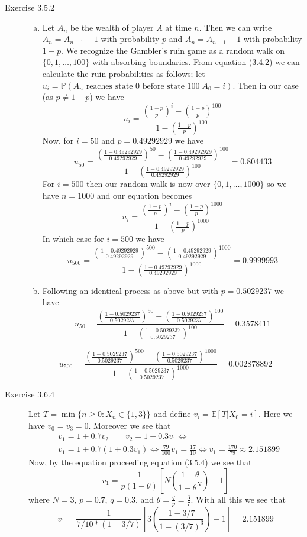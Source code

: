\documentclass[12pt]{article}  %
\newcommand{\E}{{\mathbb{E}}}
\newcommand{\prob}{{\mathbb{P}}}
\begin{document}
\begin{description}
\item[Exercise 3.5.2]
\begin{enumerate}[(a)]
\item Let $A_n$ be the wealth of player $A$ at time $n$. Then we can write $A_n = A_{n-1} + 1$ with probability $p$ and $A_n = A_{n-1}-1$ with probability $1-p$. We recognize the Gambler's ruin game as a random walk on $\{0, 1, \ldots, 100\}$ with absorbing boundaries. From equation (3.4.2) we can calculate the ruin probabilities as follows; let $u_i = \prob(\text{$A_n$ reaches state 0 before state $100$}|A_0 = i)$. Then in our case (as $p\neq 1 - p$) we have $$u_i = \frac{(\frac{1-p}{p})^i - (\frac{1-p}{p})^{100}}{1 - (\frac{1-p}{p})^{100}}$$
Now, for $i = 50$ and $p = 0.49292929$ we have 
$$u_{50} = \frac{(\frac{1-0.49292929}{0.49292929})^{50} - (\frac{1-0.49292929}{0.49292929})^{100}}{1 - (\frac{1-0.49292929}{0.49292929})^{100}} = 0.804433$$
For $i = 500$ then our random walk is now over $\{0, 1, \ldots , 1000\}$ so we have $n = 1000$ and our equation becomes
$$u_i = \frac{(\frac{1-p}{p})^{i} - (\frac{1-p}{p})^{1000}}{1 - (\frac{1-p}{p})^{1000}}$$
In which case for $i = 500$ we have 
$$u_{500} = \frac{(\frac{1-0.49292929}{0.49292929})^{500} - (\frac{1-0.49292929}{0.49292929})^{1000}}{1 - (\frac{1-0.49292929}{0.49292929})^{1000}} = 0.9999993$$
\item Following an identical process as above but with $p = 0.5029237$ we have 
$$u_{50} = \frac{(\frac{1-0.5029237}{0.5029237})^{50} - (\frac{1-0.5029237}{0.5029237})^{100}}{1 - (\frac{1-0.5029237}{0.5029237})^{100}} = 0.3578411$$
\end{enumerate}$$u_{500} = \frac{(\frac{1-0.5029237}{0.5029237})^{500} - (\frac{1-0.5029237}{0.5029237})^{1000}}{1 - (\frac{1-0.5029237}{0.5029237})^{1000}} = 0.002878892$$


\item[Exercise 3.6.4] Let $T = \min\{n\geq 0: X_n\in\{1,3\}\}$ and define $v_i = \E[T|X_0 = i]$. Here we have $v_0 = v_3 = 0$. Moreover we see that \begin{align*}&v_1 = 1 + 0.7v_2 \hspace{2em} v_2 = 1 +0.3v_1 \iff\\ 
&v_1 = 1 + 0.7(1 + 0.3v_1) \iff \frac{79}{100}v_1 = \frac{17}{10} \iff v_1 = \frac{170}{79} \approx 2.151899 
\end{align*}
Now, by the equation proceeding equation (3.5.4) we see that $$v_1 = \frac{1}{p(1-\theta)}\left[N\left(\frac{1 - \theta}{1-\theta^N}\right) - 1\right]$$ where $N = 3$, $p = 0.7$, $q = 0.3$, and $\theta = \frac{q}{p}= \frac{3}{7}$. With all this we see that 
$$v_1 = \frac{1}{7/10*(1 - 3/7)}\left[3\left(\frac{1 - 3/7}{1 - (3/7)^3}\right) - 1\right] = 2.151899$$


\end{description}
\end{document}
